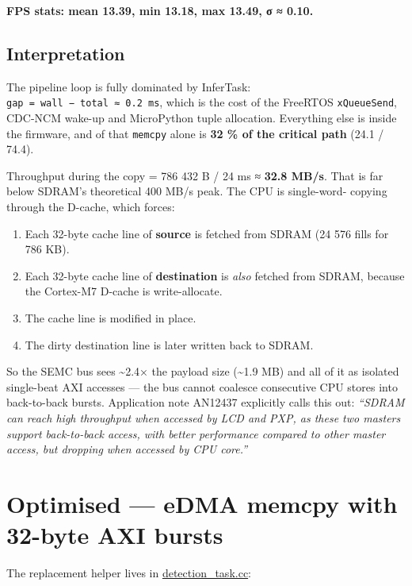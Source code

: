 \textbf{FPS stats: mean 13.39, min 13.18, max 13.49, σ ≈ 0.10.}

\subsection{Interpretation}\label{interpretation}

The pipeline loop is fully dominated by InferTask:
\texttt{gap\ =\ wall\ −\ total\ ≈\ 0.2\ ms}, which is the cost of the
FreeRTOS \texttt{xQueueSend}, CDC-NCM wake-up and MicroPython tuple
allocation. Everything else is inside the firmware, and of that
\texttt{memcpy} alone is \textbf{32 \% of the critical path} (24.1 /
74.4).

Throughput during the copy = 786 432 B / 24 ms ≈ \textbf{32.8 MB/s}.
That is far below SDRAM's theoretical 400 MB/s peak. The CPU is
single-word- copying through the D-cache, which forces:

\begin{enumerate}
\def\labelenumi{\arabic{enumi}.}
\tightlist
\item
  Each 32-byte cache line of \textbf{source} is fetched from SDRAM (24
  576 fills for 786 KB).
\item
  Each 32-byte cache line of \textbf{destination} is \emph{also} fetched
  from SDRAM, because the Cortex-M7 D-cache is write-allocate.
\item
  The cache line is modified in place.
\item
  The dirty destination line is later written back to SDRAM.
\end{enumerate}

So the SEMC bus sees \textasciitilde2.4× the payload size
(\textasciitilde1.9 MB) and all of it as isolated single-beat AXI
accesses --- the bus cannot coalesce consecutive CPU stores into
back-to-back bursts. Application note AN12437 explicitly calls this out:
\emph{``SDRAM can reach high throughput when accessed by LCD and PXP, as
these two masters support back-to-back access, with better performance
compared to other master access, but dropping when accessed by CPU
core.''}

\section{Optimised --- eDMA memcpy with 32-byte AXI
bursts}\label{optimised-edma-memcpy-with-32-byte-axi-bursts}

The replacement helper lives in
\href{../detection_task.cc}{detection\_task.cc}:

